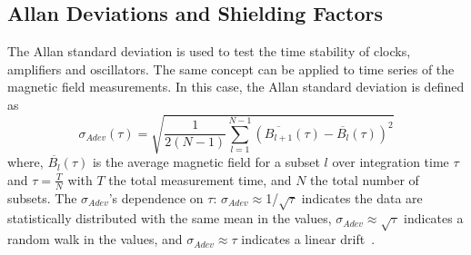 

 
 \subsection{Allan Deviations and Shielding Factors}
 
The Allan standard deviation \cite{allan} is used to test the time stability of clocks, amplifiers and oscillators. The same concept can be applied to time series of the magnetic field measurements. In this case, the Allan standard deviation is defined as~\cite{bea}
\begin{equation}\label{eq:adev}
    \sigma_{Adev} (\tau)=\sqrt{\frac{1}{2(N-1)}\sum_{l=1}^{N-1} \left(\overline{B_{l+1}}(\tau)-\overline{B_l}(\tau)\right)^2}
\end{equation}
where, $\overline{B_l}(\tau)$ is the average magnetic field for a subset $l$ over integration time $\tau$ and $\tau = \frac{T}{N}$ with $T$ the total measurement time, and $N$ the total number of subsets. The $\sigma_{Adev}$'s dependence on $\tau$: $\sigma_{Adev}\approx$1/$\sqrt{\tau}$ indicates the data are statistically distributed with the same mean in the values, $\sigma_{Adev}\approx \sqrt{\tau}$ indicates a random walk in the values, and $\sigma_{Adev}\approx \tau$ indicates a linear drift~\cite{allan_tau}. 



